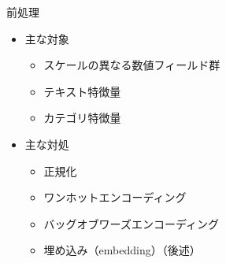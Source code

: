 \documentclass[aspectratio=169, dvipdfmx, 14pt, xcolor={svgnames,dvipsnames}, t]{beamer}
\begin{document}

\begin{frame}{前処理}

  \begin{itemize}
    \tightlist
    \item
          主な対象

          \begin{itemize}
            \tightlist
            \item
                  スケールの異なる数値フィールド群
            \item
                  テキスト特徴量
            \item
                  カテゴリ特徴量
          \end{itemize}
    \item
          主な対処

          \begin{itemize}
            \tightlist
            \item
                  正規化
            \item
                  ワンホットエンコーディング
            \item
                  バッグオブワーズエンコーディング
            \item
                  埋め込み（embedding）（後述）
          \end{itemize}
  \end{itemize}

\end{frame}

\end{document}
